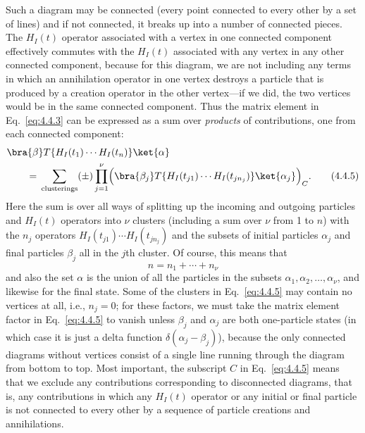 Such a diagram may be connected (every point connected to every other by a set
of lines) and if not connected, it breaks up into a number of connected pieces.
The $H_I(t)$ operator associated with a vertex in one connected component
effectively commutes with the $H_I(t)$ associated with any vertex in any other
connected component, because for this diagram, we are not including any terms
in which an annihilation operator in one vertex destroys a particle that is
produced by a creation operator in the other vertex---if we did, the two
vertices would be in the same connected component. Thus the matrix element in
Eq.~\eqref{eq:4.4.3} can be expressed as a sum over \emph{products} of contributions,
one from each connected component:
\begin{align}
&\bra{\beta}T\{H_I(t_1)\cdots H_I(t_n)\}\ket{\alpha}
\notag\\
&\qquad={}
\sum_{\text{clusterings}}(\pm)\prod_{j=1}^{\nu}
 \Bigl(\bra{\beta_j}T\{H_I(t_{j1})\cdots H_I(t_{jn_j})\}
 \ket{\alpha_j}\Bigr)_C.
\tag{4.4.5}
\label{eq:4.4.5}
\end{align}
Here the sum is over all ways of splitting up the incoming and outgoing
particles and $H_I(t)$ operators into $\nu$ clusters (including a sum over
$\nu$ from 1 to $n$) with the $n_j$ operators
$H_I(t_{j1})\cdots H_I(t_{jn_j})$ and the subsets of initial particles
$\alpha_j$ and final particles $\beta_j$ all in the $j$th cluster. Of course,
this means that
\[
n=n_1+\cdots+n_\nu
\]
and also the set $\alpha$ is the union of all the particles in the subsets
$\alpha_1,\alpha_2,\ldots,\alpha_\nu$, and likewise for the final state. Some
of the clusters in Eq.~\eqref{eq:4.4.5} may contain no vertices at all, i.e., $n_j=0$;
for these factors, we must take the matrix element factor in Eq.~\eqref{eq:4.4.5} to
vanish unless $\beta_j$ and $\alpha_j$ are both one-particle states (in which
case it is just a delta function $\delta(\alpha_j-\beta_j)$), because the only
connected diagrams without vertices consist of a single line running through
the diagram from bottom to top. Most important, the subscript $C$ in
Eq.~\eqref{eq:4.4.5} means that we exclude any contributions corresponding to disconnected
diagrams, that is, any contributions in which any $H_I(t)$ operator or any
initial or final particle is not connected to every other by a sequence of
particle creations and annihilations.

